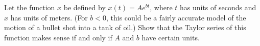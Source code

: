 Let the function $x$ be defined by $x(t)=Ae^{bt}$, where $t$ has units of seconds and
$x$ has units of meters. (For $b<0$, this could be a fairly accurate model of the motion of a
bullet shot into a tank of oil.) Show that the Taylor series of this function makes sense
if and only if $A$ and $b$ have certain units.
